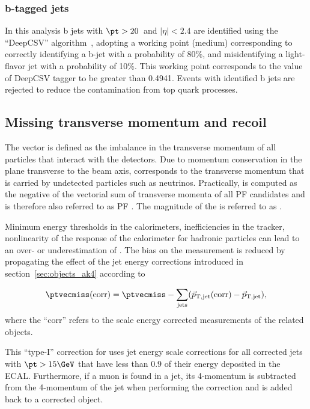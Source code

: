 \subsubsection{b-tagged jets}

In this analysis b jets with $\pt > 20$~\GeV and $|\eta| < 2.4$ are identified
using the ``DeepCSV'' algorithm~\cite{Sirunyan:2017ezt},
adopting a working point (medium) corresponding to correctly identifying a b-jet with a
probability of 80\%, and misidentifying a light-flavor jet with a probability of 10\%.
This working point corresponds to the value of DeepCSV tagger to be greater than 0.4941.
Events with identified b jets are rejected to reduce the contamination from top quark processes.

\subsection{Missing transverse momentum and recoil}

The vector \ptvecmiss is defined as the imbalance in the transverse
momentum of all particles that interact with the detectors.
Due to momentum conservation in the plane transverse to the beam axis, \ptvecmiss
corresponds to the transverse momentum that is carried by undetected particles such as neutrinos.
Practically, \ptvecmiss is computed as the negative of the vectorial sum of transverse
momenta of all PF candidates and is therefore also referred to as PF \ptvecmiss. 
The magnitude of the \ptvecmiss is referred to as \ptmiss.

Minimum energy thresholds in the calorimeters, inefficiencies
in the tracker, nonlinearity of the response of the calorimeter
for hadronic particles can lead to an over- or underestimation of \ptmiss.
The bias on the \ptmiss measurement is reduced by propagating the effect of the jet energy
corrections introduced in section~\ref{sec:objects_ak4} according to

\begin{equation}
\ptvecmiss(\mathrm{corr})
=\ptvecmiss - \sum_\mathrm{jets} (\vec{p}_\mathrm{T,jet}({\mathrm{corr}})-\vec{p}_\mathrm{T,jet}),
\label{eq:Type1MET}
\end{equation}
where the ``corr'' refers to the scale energy corrected measurements
of the related objects.

This ``type-I'' correction for \ptvecmiss uses jet energy scale corrections
for all corrected jets with $\pt>15\GeV$ that have less than $0.9$
of their energy deposited in the ECAL. Furthermore, if a muon is found in a
jet, its 4-momentum is subtracted from the 4-momentum of the jet
when performing the correction and is added back to a corrected object.

